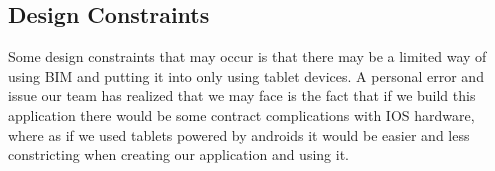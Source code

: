 \documentclass[onecolumn, draftclsnofoot,10pt, compsoc]{IEEEtran}
\begin{document}
    \subsection{Design Constraints}
         
         Some design constraints that may occur is that there may be a limited way of using BIM and putting it into only using tablet devices. A personal error and issue our team has realized that we may face is the fact that if we build this application there would be some contract complications with IOS hardware, where as if we used tablets powered by androids it would be easier and less constricting when creating our application and using it.
         
         
         
\end{document}
